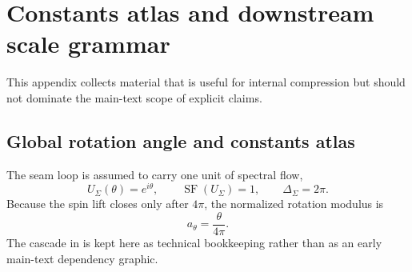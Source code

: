 \documentclass[11pt,a4paper]{article}
\theoremstyle{definition}
\theoremstyle{remark}
\DeclareMathOperator{\SF}{SF}
\newcommand{\Seam}{\Sigma}
\newcommand{\atheta}{a_\theta}
\begin{document}
\section{Constants atlas and downstream scale grammar}
\label{app:constants}

This appendix collects material that is useful for internal compression but should not dominate the main-text scope of explicit claims.

\subsection{Global rotation angle and constants atlas}

The seam loop is assumed to carry one unit of spectral flow,
\[
U_{\Seam}(\theta)=e^{i\theta},
\qquad
\SF(U_{\Seam})=1,
\qquad
\Delta_{\Seam}=2\pi.
\]
Because the spin lift closes only after $4\pi$, the normalized rotation modulus is
\[
\atheta=\frac{\theta}{4\pi}.
\]
The cascade in  is kept here as technical bookkeeping rather than as an early main-text dependency graphic.
\end{document}
